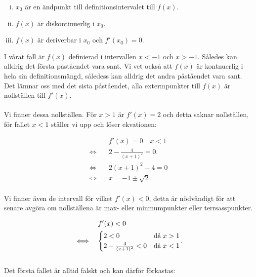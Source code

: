 \documentclass{article}
\begin{document}
\begin{enumerate}[i)]
        \item $x_{0}$ är en ändpunkt till definitionsintervalet till $f(x)$.
        \item $f(x)$ är diskontinuerlig i $x_{0}$.
        \item $f(x)$ är deriverbar i $x_{0}$ och $f'(x_{0}) = 0$.
\end{enumerate}

\noindent I vårat fall är $f(x)$ definierad i intervallen $x < -1$ och $x > -1$. Således kan alldrig det första påståendet vara sant. Vi vet också att $f(x)$ är kontnuerlig i hela sin definitionsmängd, såledess kan alldrig det andra påståendet vara sant. Det lämnar oss med det sista påståendet, alla extermpunkter till $f(x)$ är nollställen till $f'(x)$.
\\
\\
Vi finner dessa nollställen. För $x > 1$ är $f'(x) = 2$ och detta saknar nollställen, för fallet $x < 1$ ställer vi upp och löser ekvationen:

\begin{align*}
  & f'(x) = 0 \quad x < 1 \\
  \iff \quad & 2 - \frac{4}{(x + 1)^{2}} = 0 \text{.} \\
  \iff \quad & 2(x + 1)^{2} - 4 = 0 \\
  \iff \quad & x = -1 \pm \sqrt{2}\text{.}
\end{align*}
\\
Vi finner även de intervall för vilket $f'(x) < 0$, detta är nödvändigt för att senare avgöra om nollställena är max- eller minmumpunkter eller terrsasspunkter.

\begin{align}
  & f'(x) < 0 \notag \\
  \iff \quad &
  \begin{aligned}
    \begin{cases}
      2 < 0 & \text{då} \; x > 1 \\
      2 - \frac{4}{(x+1)^{2}} < 0 & \text{då} \; x < 1
    \end{cases}
  \end{aligned}\text{.} \label{fp_cases}
\end{align}
\\
Det första fallet är alltid falskt och kan därför förkastas:
\end{document}
